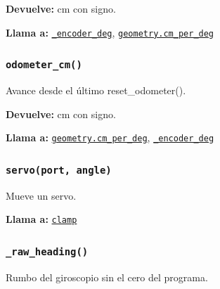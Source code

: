\noindent\textbf{Devuelve:} cm con signo.\par
\noindent\textbf{Llama a:} \hyperref[fn:hal:-encoder-deg]{\texttt{\_\allowbreak{}encoder\_\allowbreak{}deg}}, \hyperref[fn:geometry:cm-per-deg]{\texttt{geometry.cm\_\allowbreak{}per\_\allowbreak{}deg}}\par

\subsubsection{\texttt{odometer\_\allowbreak{}cm()}}\label{fn:hal:odometer-cm}
\noindent Avance desde el último reset\_odometer().

\noindent\textbf{Devuelve:} cm con signo.\par
\noindent\textbf{Llama a:} \hyperref[fn:geometry:cm-per-deg]{\texttt{geometry.cm\_\allowbreak{}per\_\allowbreak{}deg}}, \hyperref[fn:hal:-encoder-deg]{\texttt{\_\allowbreak{}encoder\_\allowbreak{}deg}}\par

\subsubsection{\texttt{servo(port, angle)}}\label{fn:hal:servo}
\noindent Mueve un servo.

\par{}\par\smallskip
\noindent\textbf{Llama a:} \hyperref[fn:hal:clamp]{\texttt{clamp}}\par

\subsubsection{\texttt{\_\allowbreak{}raw\_\allowbreak{}heading()}}\label{fn:hal:-raw-heading}
\noindent Rumbo del giroscopio sin el cero del programa.

